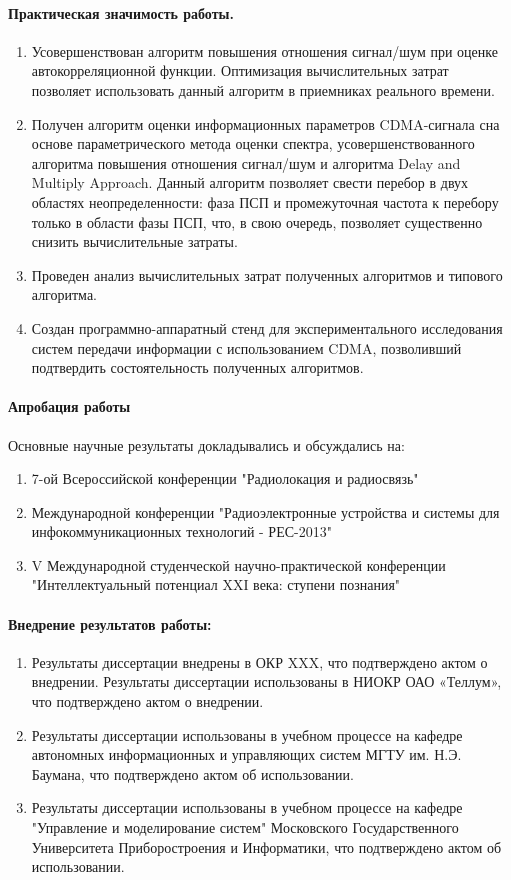 \paragraph{Практическая значимость работы.}
\begin{enumerate}
	\item {Усовершенствован алгоритм повышения отношения сигнал/шум при оценке автокорреляционной функции. Оптимизация вычислительных затрат позволяет использовать
		данный алгоритм в приемниках реального времени.}
	\item {Получен алгоритм оценки информационных параметров CDMA-сигнала сна основе параметрического метода оценки спектра, усовершенствованного
		алгоритма повышения отношения сигнал/шум и алгоритма Delay and Multiply Approach. Данный алгоритм
		позволяет свести перебор в двух областях неопределенности: фаза ПСП и промежуточная частота к перебору только в области фазы ПСП, что, в свою очередь, позволяет
		существенно снизить вычислительные затраты.}
	\item {Проведен анализ вычислительных затрат полученных алгоритмов и типового алгоритма.}
	\item {Создан программно-аппаратный стенд для экспериментального исследования систем передачи информации с использованием CDMA, позволивший подтвердить
		состоятельность полученных алгоритмов.}
\end{enumerate}

\paragraph{Апробация работы}
Основные научные результаты докладывались и обсуждались на:
\begin{enumerate}
	\item 7-ой Всероссийской конференции "Радиолокация и радиосвязь"
	\item Международной конференции "Радиоэлектронные устройства и системы для инфокоммуникационных технологий - РЕС-2013"
	\item V Международной студенческой научно-практической конференции "Интеллектуальный потенциал XXI века: ступени познания"
\end{enumerate}

\paragraph{Внедрение результатов работы:}
\begin{enumerate}
	\item Результаты диссертации внедрены в ОКР XXX, что подтверждено актом о внедрении. 
	Результаты диссертации использованы в НИОКР ОАО «Теллум», что подтверждено актом о внедрении.
	\item Результаты диссертации использованы в учебном процессе на кафедре автономных информационных и управляющих систем МГТУ им. Н.Э. Баумана,
		что подтверждено актом об использовании.
	\item Результаты диссертации использованы в учебном процессе на кафедре "Управление и моделирование систем"
		Московского Государственного Университета Приборостроения и Информатики, что подтверждено актом об использовании.
\end{enumerate}

